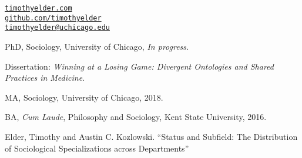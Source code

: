 \documentclass[11pt,article,oneside]{memoir}
\makeatletter
\def\myemail{timothyelder@uchicago.edu}
\def\myweb{timothyelder.com}
\makeatother
\begin{document}
\begin{minipage}[t]{2.95in}

\end{minipage}
\hfill
\hfill
\begin{minipage}[t]{1.5in}
  \flushright \footnotesize  \addressblock
  {\scriptsize  \texttt{\href{http://timothyelder.com/}{\myweb}}}  \\
  {\scriptsize  \texttt{\href{https://github.com/timothyelder}{github.com/timothyelder} } \\
  {\scriptsize  \texttt{\href{mailto:\myemail}{\myemail}} }}
\end{minipage}

\medskip

\reversemarginpar

\bigskip



\ind PhD, Sociology, University of Chicago, \emph{In progress}.

\ind \hspace{0.35in} \footnotesize Dissertation: \emph{Winning at a Losing Game: Divergent Ontologies and Shared Practices in Medicine}. \normalsize \vspace{0.05in}

\ind MA, Sociology, University of Chicago, 2018.

\ind BA, \emph{Cum Laude}, Philosophy and Sociology, Kent State University, 2016. \vspace{0.05in}

\bigskip


\ind Elder, Timothy and Austin C. Kozlowski. “Status and Subfield: The Distribution of Sociological Specializations across Departments” \vspace{0.05in}
\end{document}

